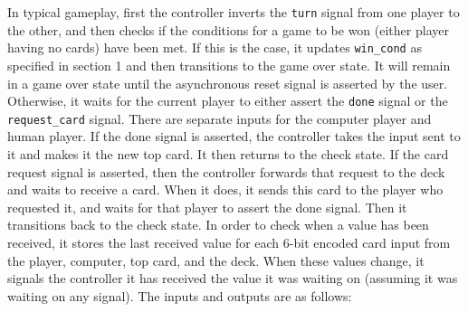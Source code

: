 \documentclass[12pt]{article}
\begin{document}
In typical gameplay, first the controller inverts the \texttt{turn} signal from one player to the other, and then checks if the conditions for a game to be won (either player having no cards) have been met. If this is the case, it updates \texttt{win\_cond} as specified in section 1 and then transitions to the game over state. It will remain in a game over state until the asynchronous reset signal is asserted by the user. Otherwise, it waits for the current player to either assert the \texttt{done} signal or the \texttt{request\_card} signal. There are separate inputs for the computer player and human player. If the done signal is asserted, the controller takes the input sent to it and makes it the new top card. It then returns to the check state. If the card request signal is asserted, then the controller forwards that request to the deck and waits to receive a card. When it does, it sends this card to the player who requested it, and waits for that player to assert the done signal. Then it transitions back to the check state. In order to check when a value has been received, it stores the last received value for each 6-bit encoded card input from the player, computer, top card, and the deck. When these values change, it signals the controller it has received the value it was waiting on (assuming it was waiting on any signal). The inputs and outputs are as follows:\\
\end{document}

